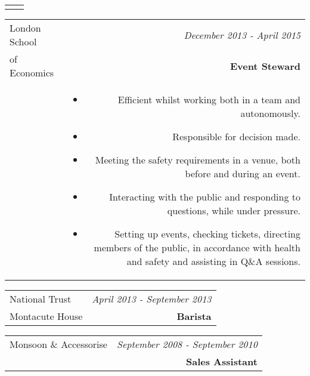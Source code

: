 \documentclass[10pt]{article}
\begin{document}
\begin{flushleft}
\begin{tabular}{L!{\VRule}R}
\begin{itemize}
\end{itemize}

\end{tabular}



\begin{tabular}{L!{\VRule}R}

London School&\textsl{December 2013 - April 2015}\\
of Economics&\textbf{Event Steward}\\

&\vspace{-2mm}

\begin{itemize} \itemsep1pt \parskip0pt 

\item Efficient whilst working both in a team and autonomously.
\item Responsible for decision made.
\item Meeting the safety requirements in a venue, both before and during an event.
\item Interacting with the public and responding to questions, while under pressure.
\item Setting up events, checking tickets, directing members of the public, in accordance with health and safety and assisting in Q\&A sessions.

\end{itemize}

\end{tabular}



\begin{tabular}{L!{\VRule}R}

National Trust&\textsl{April 2013 - September 2013}\\
Montacute House&\textbf{Barista}

\end{tabular}



\begin{tabular}{L!{\VRule}R}

Monsoon \& Accessorise&\textsl{September 2008 - September 2010}\\
&\vspace{-8mm} \textbf{Sales Assistant}

\end{tabular}


\end{flushleft}
\end{document}
